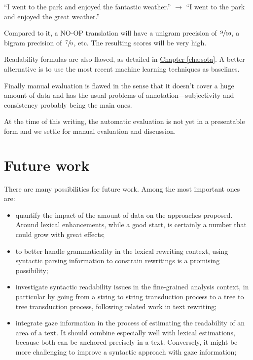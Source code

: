 \documentclass[a4paper, 11pt, onepage]{scrreprt}
\newcommand\chapterref[1]{\hyperref[#1]{Chapter \ref*{#1}}}
\begin{document}
“I went to the park and enjoyed the fantastic weather.” $\rightarrow$
“I went to the park and enjoyed the great weather.”

Compared to it, a NO-OP translation will have a unigram precision of
$\,\sfrac{9}{10}$, a bigram precision of $\,\sfrac{7}{9}$, etc. The
resulting scores will be very high.

Readability formulas are also flawed, as detailed
in \chapterref{cha:sota}. A better alternative is to use the most
recent machine learning techniques as baselines.

Finally manual evaluation is flawed in the sense that it doesn't cover
a huge amount of data and has the usual problems of
annotation—subjectivity and consistency probably being the main
ones.

At the time of this writing, the automatic evaluation is not yet in a
presentable form and we settle for manual evaluation and discussion.

\chapter{Future work}
\label{cha:future-work}

There are many possibilities for future work. Among the most important
ones are:

\begin{itemize}
\item quantify the impact of the amount of data on the approaches
  proposed. Around  lexical enhancements, while a good
  start, is certainly a number that could grow with great effects;
\item to better handle grammaticality in the lexical rewriting
  context, using syntactic parsing information to constrain rewritings
  is a promising possibility;
\item investigate syntactic readability issues in the fine-grained
  analysis context, in particular by going from a string to string
  transduction process to a tree to tree transduction process,
  following related work in text rewriting;
\item integrate gaze information in the process of estimating the
  readability of an area of a text. It should combine especially well
  with lexical estimations, because both can be anchored precisely in
  a text. Conversely, it might be more challenging to improve a
  syntactic approach with gaze information;
\end{itemize}
\end{document}
